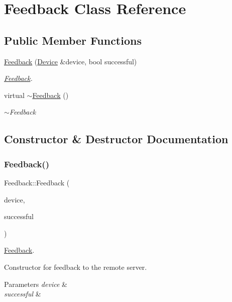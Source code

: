 \hypertarget{classFeedback}{}\section{Feedback Class Reference}
\label{classFeedback}
\subsection*{Public Member Functions}
\begin{DoxyCompactItemize}
\item 
\hyperlink{classFeedback_ac80ed1bfec6114cd174fcdbb91974ffe}{Feedback} (\hyperlink{classDevice}{Device} \&device, bool successful)
\begin{DoxyCompactList}\small\item\em \hyperlink{classFeedback}{Feedback}. \end{DoxyCompactList}\item 
virtual \hyperlink{classFeedback_aa5037cce52fef7c63980caef4e13532c}{$\sim$\+Feedback} ()
\begin{DoxyCompactList}\small\item\em $\sim$\+Feedback \end{DoxyCompactList}\end{DoxyCompactItemize}


\subsection{Constructor \& Destructor Documentation}
\mbox{\label{classFeedback_ac80ed1bfec6114cd174fcdbb91974ffe}} 
\subsubsection{\texorpdfstring{Feedback()}{Feedback()}}
{\footnotesize\ttfamily Feedback\+::\+Feedback (\begin{DoxyParamCaption}\item[{\hyperlink{classDevice}{Device} \&}]{device,  }\item[{bool}]{successful }\end{DoxyParamCaption})}



\hyperlink{classFeedback}{Feedback}. 

Constructor for feedback to the remote server. 
\begin{DoxyParams}{Parameters}
{\em device} & \\
\hline
{\em successful} & \\
\hline
\end{DoxyParams}
\mbox{\label{classFeedback_aa5037cce52fef7c63980caef4e13532c}} 

